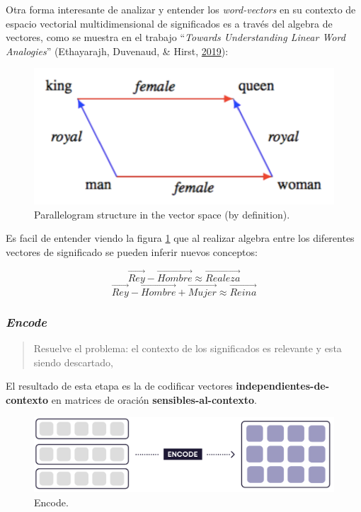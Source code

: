 \documentclass[12pt,a4paper,]{scrartcl}
\begin{document}
Otra forma interesante de analizar y entender los \emph{word-vectors} en su contexto de espacio vectorial multidimensional de significados es a través del algebra de vectores, como se muestra en el trabajo \enquote{\emph{Towards Understanding Linear Word Analogies}} (Ethayarajh, Duvenaud, \& Hirst, \protect\hyperlink{ref-ethayarajh-etal-2019-towards}{2019}):

\begin{figure}[H]

{\centering \includegraphics[width=0.6\linewidth]{assets/parallelogram.pdf} 

}

\caption{Parallelogram structure in the vector space (by definition).}\label{fig:vec-parallelogram}
\end{figure}

Es facil de entender viendo la figura \ref{fig:vec-parallelogram} que al realizar algebra entre los diferentes vectores de significado se pueden inferir nuevos conceptos:

\[\vec{Rey} - \vec{Hombre} \approx \vec{Realeza}\]
\[\vec{Rey} - \vec{Hombre} + \vec{Mujer} \approx \vec{Reina}\]

\hypertarget{encode}{%
\subsubsection{\texorpdfstring{\emph{Encode}}{Encode}}\label{encode}}

\begin{quote}
Resuelve el problema: el contexto de los significados es relevante y esta siendo descartado,
\end{quote}

El resultado de esta etapa es la de codificar vectores \textbf{independientes-de-contexto} en matrices de oración \textbf{sensibles-al-contexto}.

\begin{figure}[H]

{\centering \includegraphics{assets/deep-learning-formula-nlp_encode.pdf} 

}

\caption{Encode.}\label{fig:formula-encode}
\end{figure}
\end{document}
